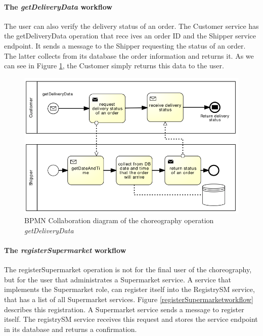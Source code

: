 \paragraph{The \emph{getDeliveryData} workflow\\}
The user can also verify the delivery status of an order. The Customer service has the getDeliveryData operation that rece	ives an order ID and the Shipper service endpoint. It sends a message to the Shipper requesting the status of an order. The latter collects from its database the order information and returns it. As we can see in Figure \ref{getDeliveryDataworkflow}, the Customer simply returns this data to the user.

\begin{figure}[htbp]
\begin{center}
	\includegraphics{images/getDeliveryDataworkflow}
\caption{BPMN Collaboration diagram of the choreography operation \emph{getDeliveryData}}
\label{getDeliveryDataworkflow}
\end{center}
\end{figure}

\paragraph{The \emph{registerSupermarket} workflow\\}
The registerSupermarket operation is not for the final user of the choreography, but for the user that administrates a Supermarket service. A service that implements the Supermarket role, can register itself into the RegistrySM service, that has a list of all Supermarket services. Figure \ref{registerSupermarketworkflow} describes this registration. A Supermarket service sends a message to register itself. The registrySM service receives this request and stores the service endpoint in its database and returns a confirmation.

